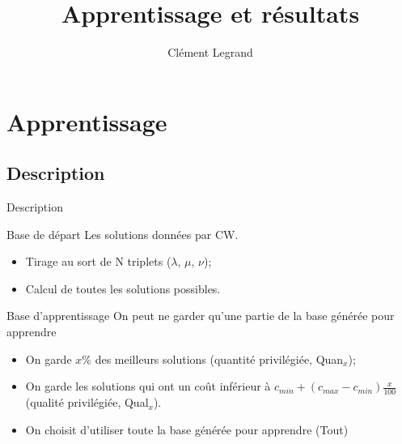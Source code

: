 \documentclass{beamer}
\title{Apprentissage et résultats}
\author{Clément Legrand}
\begin{document}
\begin{frame}[plain]
\titlepage
\end{frame}

\section{Apprentissage}

\subsection{Description}

\begin{frame}{Description}
\begin{block}{Base de départ}
Les solutions données par CW.
\begin{itemize}
\item Tirage au sort de N triplets ($\lambda$, $\mu$, $\nu$);
\item Calcul de toutes les solutions possibles.
\end{itemize}
\end{block}

\begin{block}{Base d'apprentissage}
On peut ne garder qu'une partie de la base générée pour apprendre
\begin{itemize}
\item On garde $x\%$ des meilleurs solutions (quantité privilégiée, Quan$_{x}$);
\item On garde les solutions qui ont un coût inférieur à $c_{min} + (c_{max}-c_{min})\frac{x}{100}$ (qualité privilégiée, Qual$_{x}$).
\item On choisit d'utiliser toute la base générée pour apprendre (Tout)
\end{itemize}
\end{block}
\end{frame}
\end{document}
